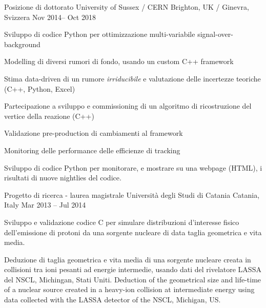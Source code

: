   \begin{cventries}    
    \cventry
    {Posizione di dottorato}
    {University of Sussex / CERN}
    {Brighton, UK / Ginevra, Svizzera}
    {Nov 2014-- Oct 2018}
    {
    \begin{cvitems}
      \item Sviluppo di codice Python per ottimizzazione multi-variabile signal-over-background 
      \item Modelling di diversi rumori di fondo, usando un custom C++ framework
      \item Stima data-driven di un rumore \emph{irriducibile} e valutazione delle incertezze teoriche (C++, Python, Excel)
      \item Partecipazione a sviluppo e commissioning di un algoritmo di ricostruzione del vertice della reazione (C++)
      \item Validazione pre-production di cambiamenti al framework
      \item Monitoring delle performance delle efficienze di tracking
      \item Sviluppo di codice Python per monitorare, e mostrare su una webpage (HTML), i risultati di nuove nightlies del codice.
    \end{cvitems}
    }
  \end{cventries}

  \begin{cventries}    
    \cventry
    {Progetto di ricerca - laurea magistrale}
    {Università degli Studi di Catania}
    {Catania, Italy}
    {Mar 2013 -- Jul 2014}
    {
    \begin{cvitems}
      \item Sviluppo e validazione codice C per simulare distribuzioni d'interesse fisico dell'emissione di protoni da una sorgente nucleare di data taglia geometrica e vita media. 
      \item Deduzione di taglia geometrica e vita media di una sorgente nucleare creata in collisioni tra ioni pesanti ad energie intermedie, usando dati del rivelatore LASSA del NSCL, Michingan, Stati Uniti.  Deduction of the geometrical size and life-time of a nuclear source created in a heavy-ion collision at intermediate energy using data collected with the LASSA detector of the NSCL, Michigan, US.
    \end{cvitems}
    }
  \end{cventries}
